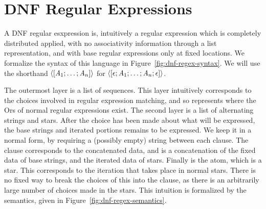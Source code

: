 \section{DNF Regular Expressions}


A DNF regular esxpression is, intuitively
a regular expression which is completely distributed
applied, with no associativity information through a list representation,
and with base regular expressions only at fixed locations.
We formalize the syntax of this language in Figure~\ref{fig:dnf-regex-syntax}.
We will use the shorthand $\langle[\mathit{A}_1;\ldots;\mathit{A}_n]\rangle$
for $\langle[\epsilon;\mathit{A}_1;\ldots;\mathit{A}_n;\epsilon]\rangle$.

The outermost layer is a list of sequences.
This layer intuitively corresponds to the choices involved in regular expression matching, and so represents where the Ors of normal regular expressions exist.
The second layer is a list of alternating strings and stars.
After the choice has been made about what will be expressed,
the base strings and iterated portions remains to be expressed.
We keep it in a normal form, by requiring a (possibly empty) string between
each clause.
The clause corresponds to the concatenated data, and is a concatenation of the
fixed data of base strings, and the iterated data of stars.
Finally is the atom, which is a star.
This corresponds to the iteration that takes place in normal stars.
There is no fixed way to break the choices of this into the clause,
as there is an arbitrarily large number of choices made in the stars.
This intuition is formalized by the semantics, given in
Figure~\ref{fig:dnf-regex-semantics}.

